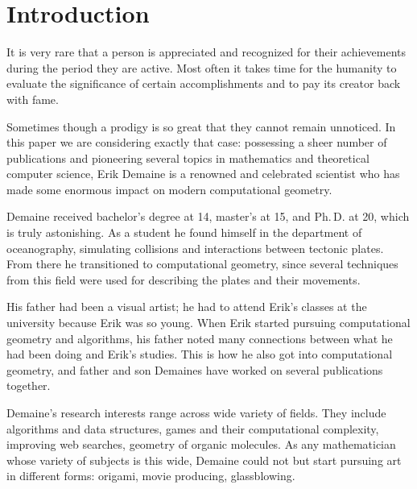 \documentclass[a4paper,12pt]{article}
\begin{document}
\restoregeometry

\newpage \maketitle \vspace{1cm}

\tableofcontents \vfill \eject

\section{Introduction}

It is very rare that a person is appreciated and recognized for their achievements during the period they are active. Most often it takes time for the humanity to evaluate the significance of certain accomplishments and to pay its creator back with fame.

Sometimes though a prodigy is so great that they cannot remain unnoticed. In this paper we are considering exactly that case: possessing a sheer number of publications and pioneering several topics in mathematics and theoretical computer science, Erik Demaine is a renowned and celebrated scientist who has made some enormous impact on modern computational geometry.

Demaine received bachelor's degree at 14, master's at 15, and Ph.\,D. at 20, which is truly astonishing. As a student he found himself in the department of oceanography, simulating collisions and interactions between tectonic plates. From there he transitioned to computational geometry, since several techniques from this field were used for describing the plates and their movements.

His father had been a visual artist; he had to attend Erik's classes at the university because Erik was so young. When Erik started pursuing computational geometry and algorithms, his father noted many connections between what he had been doing and Erik's studies. This is how he also got into computational geometry, and father and son Demaines have worked on several publications together.

Demaine's research interests range across wide variety of fields. They include algorithms and data structures, games and their computational complexity, improving web searches, geometry of organic molecules. As any mathematician whose variety of subjects is this wide, Demaine could not but start pursuing art in different forms: origami, movie producing, glassblowing.
\end{document}
